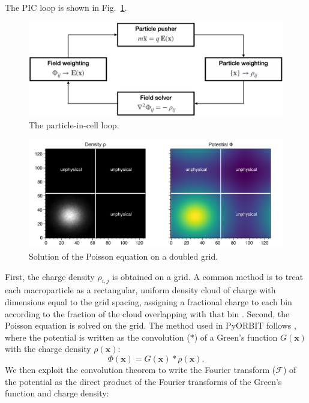 The PIC loop is shown in Fig.~\ref{fig:pic_loop}. 
%
\begin{figure}[!p]
    \centering
    \includegraphics[width=\textwidth]{Images/chapter3/pic_loop.png}
    \caption{\label{fig:pic_loop}The particle-in-cell loop.}
\end{figure}
\begin{figure}[!p]
    \centering
    \includegraphics[width=\textwidth]{Images/chapter3/poisson.png}
    \caption{\label{fig:poisson}Solution of the Poisson equation on a doubled grid.}
\end{figure}
%
First, the charge density $\rho_{i,j}$ is obtained on a grid. A common method is to treat each macroparticle as a rectangular, uniform density cloud of charge with dimensions equal to the grid spacing, assigning a fractional charge to each bin according to the fraction of the cloud overlapping with that bin \cite{Birdsall1975}. Second, the Poisson equation is solved on the grid. The method used in PyORBIT follows \cite{Hockney1981}, where the potential is written as the convolution ($*$) of a Green's function $G(\mathbf{x})$ with the charge density $\rho(\mathbf{x})$:
%
\begin{equation}
    \Phi(\mathbf{x}) = G(\mathbf{x}) * \rho(\mathbf{x}).
\end{equation}
%
We then exploit the convolution theorem \cite{Arfken1985} to write the Fourier transform ($\mathcal{F}$) of the potential as the direct product of the Fourier transforms of the Green's function and charge density:
